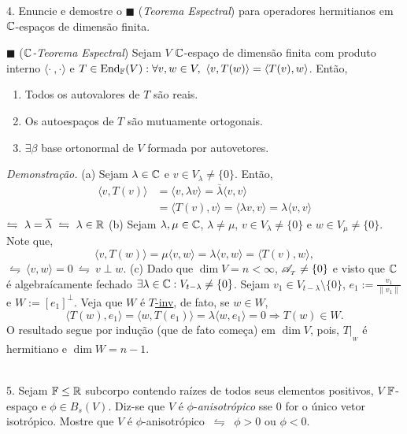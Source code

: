 \hspace{-0.1cm}4. Enuncie e demostre o \(\blacksquare\) (\emph{Teorema Espectral}) para operadores hermitianos em \(\mathbb{C}\)-espaços de dimensão finita. \\ 
    \textcolor{gris}{
        \(\blacksquare\) (\emph{\(\mathbb{C}\)-Teorema Espectral}) Sejam \(V\) \(\mathbb{C}\)-espaço de dimensão finita com produto interno \(\langle\cdot \ ,  \cdot\rangle\) e \(T \in \ehom(V) : \forall v, w \in V, \ \langle v, T(w)\rangle = \langle T(v), w \rangle \). Então,
        \begin{enumerate}[label = (\alph*) ]
            \item Todos os autovalores de \(T\) são reais. 
            \item Os autoespaços de \(T\) são mutuamente ortogonais. 
            \item \(\exists \beta\) base ortonormal de \(V\) formada por autovetores. 
        \end{enumerate}
        \emph{Demonstração.} (a) Sejam \(\lambda \in \mathbb{C}\) e \(v \in V_\lambda\neq \{0\}\). Então, 
        \begin{align*}
        \langle v, T(v)\rangle &=  \langle v, \lambda v\rangle =\overline{\lambda}\langle v, v\rangle \\ 
        &=  \langle T(v), v\rangle = \langle  \lambda v,v\rangle = \lambda\langle v,v\rangle  
        \end{align*}
        \(\leftrightharpoons \ \lambda = \overline{\lambda} \ \leftrightharpoons \ \lambda \in \R\) (b) Sejam \(\lambda, \mu \in \mathbb{C}\), \(\lambda \neq \mu\), \(v\in V_\lambda \neq \{0\} \) e \(w \in V_\mu \neq \{0\}\). Note que,  
        \[\langle v, T(w)\rangle = \mu \langle v, w\rangle = \lambda \langle v , w\rangle  = \langle T(v), w\rangle, \]
        \(\leftrightharpoons\ \langle v, w \rangle = 0 \ \leftrightharpoons \ v \perp w\). (c) Dado que \(\dim V =n <\infty\), \(\mathscr{A}_{_T} \neq \{0\}\) e visto que \(\mathbb{C}\) é algebraícamente fechado \(\exists \lambda \in \mathbb{C} : V_{t-\lambda} \neq \{0\}\). Sejam \(v_1 \in V_{t-\lambda}\setminus \{0\}\), \(e_1 := \frac{v_1}{\|v_1\|}\) e \(W := [e_1]^\perp\). Veja que \(W\) é \underline{\(T\)-inv}, de fato, se \(w\in W\), 
        \[\langle T(w), e_1 \rangle = \langle w, T(e_1)\rangle = \lambda \langle w, e_1 \rangle = 0 \Rightarrow T(w) \in W. \] 
        O resultado segue por indução (que de fato começa) em \(\dim V\), pois, \(T|_{_W}\) é hermitiano e \(\dim W = n-1\). 
    }\\ 
5. Sejam \(\mathbb{F}\leq \mathbb{R}\) subcorpo contendo raízes de todos seus elementos positivos, \(V\) \(\mathbb{F}\)-espaço e \(\phi \in B_s(V)\). Diz-se que \(V\) é \(\phi\)-\emph{anisotrópico} sse \(0\) for o único vetor isotrópico. Mostre que \(V\) é \(\phi\)-anisotrópico \( \ \leftrightharpoons \ \) \(\phi > 0 \) ou \(\phi < 0 \). \\
